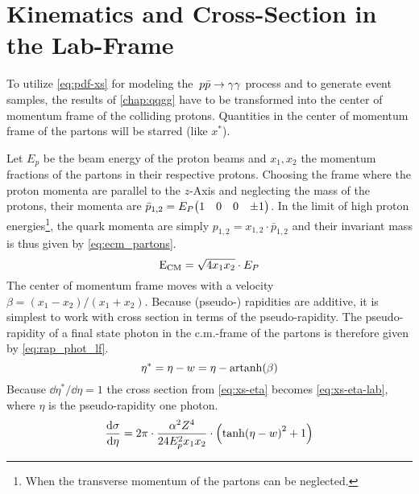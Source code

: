 \section{Kinematics and Cross-Section in the Lab-Frame}%
\label{sec:lab_xs}

To utilize \cref{eq:pdf-xs} for modeling the~\(p\bar{p}\rightarrow\gamma\gamma\) process and to
generate event samples, the results of \cref{chap:qqgg} have to be
transformed into the center of momentum frame of the colliding
protons. Quantities in the center of momentum frame of the partons
will be starred (like \(x^\ast\)).

Let \(E_p\) be the beam energy of the proton beams and \(x_1, x_2\)
the momentum fractions of the partons in their respective protons.
Choosing the frame where the proton momenta are parallel to the
\(z\)-Axis and neglecting the mass of the protons, their momenta are
\(\bar{p}_{1,2} = E_P \mqty(1 & 0 & 0 & \pm1)\). In the limit of high
proton energies\footnote{When the transverse momentum of the partons
  can be neglected.}, the quark momenta are simply
\(p_{1,2}=x_{1,2}\cdot\bar{p}_{1,2}\) and their invariant mass is thus
given by \cref{eq:ecm_partons}.
%
\begin{equation}
  \label{eq:ecm_partons}
  \operatorname{E_{\text{CM}}} = \sqrt{4x_1x_2}\cdot E_P
\end{equation}
%
The center of momentum frame moves with a velocity
\(\beta = (x_1-x_2)/(x_1+x_2)\). Because (pseudo-) rapidities are
additive, it is simplest to work with cross section in terms of the
pseudo-rapidity.  The pseudo-rapidity of a final state photon in the
c.m.-frame of the partons is therefore given
by \cref{eq:rap_phot_lf}.
%
\begin{equation}
  \label{eq:rap_phot_lf}
  \eta^\ast = \eta - w = \eta - \operatorname{artanh}(\beta)
\end{equation}
%
Because \(\dd{\eta^\ast}/{\dd{\eta}} = 1\) the cross section
from \cref{eq:xs-eta} becomes \cref{eq:xs-eta-lab}, where \(\eta\) is
the pseudo-rapidity one photon.
%
\begin{equation}
  \label{eq:xs-eta-lab}
  \dv{\sigma}{\eta} = 2\pi\cdot\frac{\alpha^2Z^4}{24 E_p^2
    x_1x_2}\cdot\qty(\tanh(\eta - w)^2 + 1)
\end{equation}
%
\begin{wrapfigure}{R}{0.4\textwidth}
\centering
{}
\end{wrapfigure}
